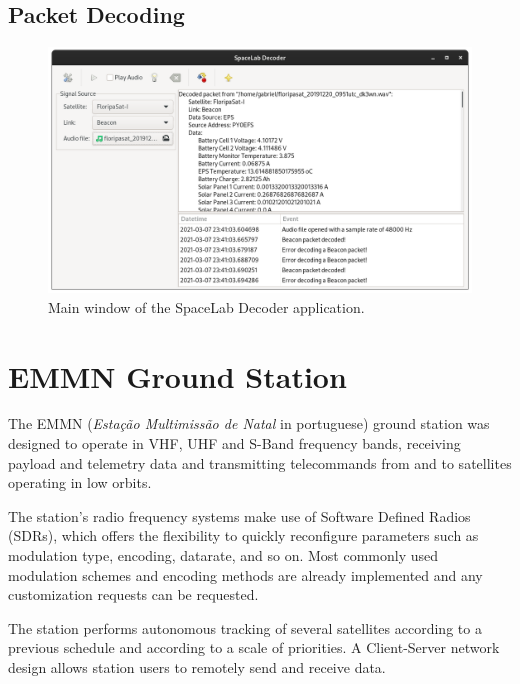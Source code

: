 \subsection{Packet Decoding}

\cite{spacelab-decoder}

\begin{figure}[!ht]
    \begin{center}
        \includegraphics[width=\textwidth]{figures/spacelab-decoder.png}
        \caption{Main window of the SpaceLab Decoder application.}
        \label{fig:spacelab-decoder}
    \end{center}
\end{figure}

\section{EMMN Ground Station}

The EMMN (\textit{Estação Multimissão de Natal} in portuguese) ground station \cite{emmn} was designed to operate in VHF, UHF and S-Band frequency bands, receiving payload and telemetry data and transmitting telecommands from and to satellites operating in low orbits.

The station's radio frequency systems make use of Software Defined Radios (SDRs), which offers the flexibility to quickly reconfigure parameters such as modulation type, encoding, datarate, and so on. Most commonly used modulation schemes and encoding methods are already implemented and any customization requests can be requested.

The station performs autonomous tracking of several satellites according to a previous schedule and according to a scale of priorities. A Client-Server network design allows station users to remotely send and receive data.

